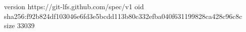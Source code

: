 version https://git-lfs.github.com/spec/v1
oid sha256:f92b824df103046e6fd3e5bcdd113b80c332efba040f631199828ca428c96c8c
size 33039
